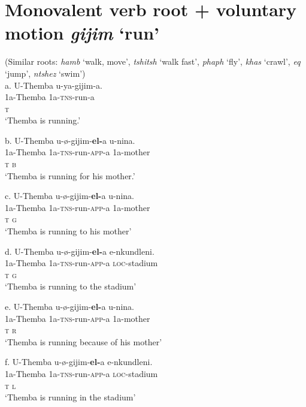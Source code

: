 \chapter[Monovalent verb root + voluntary motion gijim ‘run’]{Monovalent verb root + voluntary motion \textit{gijim }‘run’}
     (Similar roots: \textit{hamb} ‘walk, move’, \textit{tshitsh} ‘walk fast’, \textit{phaph} ‘fly’, \textit{khas} ‘crawl’, \textit{eq} ‘jump’, \textit{ntshez} ‘swim’)\\
\gll   a.  U-Themba   u-ya-gijim-a.\\
         1a-Themba     1a-\textsc{tns}{}-run-a \\
         \textsc{t}\\
\glt     ‘Themba is running.’
\z

\gll   b.  U-Themba   u-ø-gijim-\textbf{el-}a      u-nina. \\
         1a-Themba     1a-\textsc{tns}{}-run-\textsc{app}{}-a    1a-mother\\
         \textsc{t                    b}\\
\glt     ‘Themba is running for his mother.’   
\z

\gll   c.  U-Themba    u-ø-gijim-\textbf{el-}a      u-nina. \\
         1a-Themba  1a-\textsc{tns}{}-run-\textsc{app}{}-a    1a-mother\\
         \textsc{t                    g}\\
\glt     ‘Themba is running to his mother’
\z

\gll   d.  U-Themba    u-ø-gijim-\textbf{el-}a      e-nkundleni. \\
         1a-Themba  1a-\textsc{tns}{}-run-\textsc{app}{}-a    \textsc{loc}{}-stadium\\
         \textsc{t                    g}\\
\glt     ‘Themba is running to the stadium’
\z

\gll   e.  U-Themba   u-ø-gijim-\textbf{el-}a      u-nina. \\
         1a-Themba     1a-\textsc{tns}{}-run-\textsc{app}{}-a    1a-mother\\
         \textsc{t                    r}\\
\glt     ‘Themba is running because of his mother’
\z

\gll   f.  U-Themba   u-ø-gijim-\textbf{el-}a    e-nkundleni. \\
         1a-Themba     1a-\textsc{tns}{}-run-\textsc{app}{}-a  \textsc{loc}{}-stadium\\
         \textsc{t                  l}\\
\glt     ‘Themba is running in the stadium’
\z

